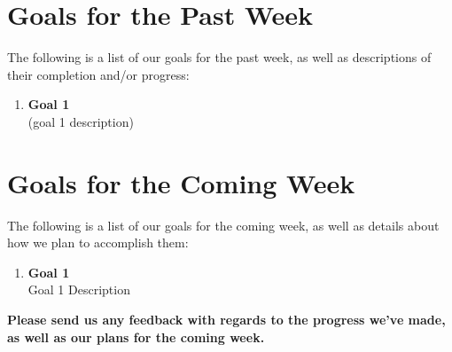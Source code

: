 \documentclass[]{../auvsi_doc}
\begin{document}
\section{Goals for the Past Week}

The following is a list of our goals for the past week, as well as descriptions of their completion and/or progress:

\begin{enumerate}
\item \textbf{Goal 1}\\
(goal 1 description)
\end{enumerate}

\section{Goals for the Coming Week}

The following is a list of our goals for the coming week, as well as details about how we plan to accomplish them:

\begin{enumerate}
\item \textbf{Goal 1}\\
Goal 1 Description
\end{enumerate}

\textbf{Please send us any feedback with regards to the progress we've made, as well as our plans for the coming week.}

\newpage
\begin{appendices}



\end{appendices}
\end{document}
